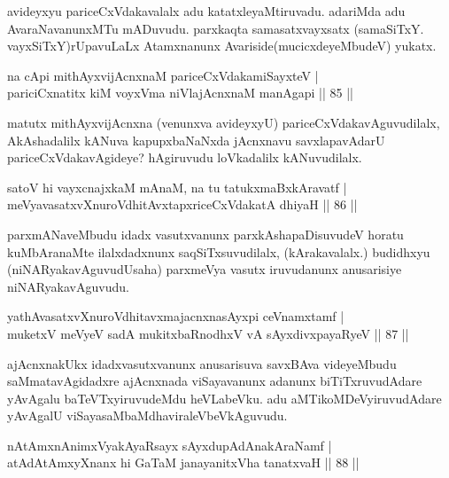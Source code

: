 \begin{artha}
avideyxyu pariceCxVdakavalalx adu katatxleyaMtiruvadu. adariMda adu AvaraNavanunxMTu mADuvudu. parxkaqta samasatxvayxsatx (samaSiTxY. vayxSiTxY)rUpavuLaLx Atamxnanunx Avariside(mucicxdeyeMbudeV) yukatx.
\end{artha}

\begin{shl}
na cApi mithAyxvijAcnxnaM pariceCxVdakamiSayxteV |\\
pariciCxnatitx kiM voyxVma niVlajAcnxnaM manAgapi \hfill || 85 ||
\end{shl}

\begin{artha}
matutx mithAyxvijAcnxna (venunxva avideyxyU) pariceCxVdakavAguvudilalx, AkAshadalilx 
kANuva kapupxbaNaNxda jAcnxnavu savxlapavAdarU pariceCxVdakavAgideye? hAgiruvudu loVkadalilx 
kANuvudilalx.
\end{artha}

\begin{shl}
satoV hi vayxcnajxkaM mAnaM, na tu tatukxmaBxkAravatf |\\
meVyavasatxvXnuroVdhitAvxtapxriceCxVdakatA dhiyaH \hfill || 86 ||
\end{shl}

\begin{artha}
parxmANaveMbudu idadx vasutxvanunx parxkAshapaDisuvudeV horatu kuMbAranaMte ilalxdadxnunx 
saqSiTxsuvudilalx, (kArakavalalx.) budidhxyu (niNARyakavAguvudUsaha) parxmeVya vasutx 
iruvudanunx anusarisiye niNARyakavAguvudu.
\end{artha}

\begin{shl}
yathAvasatxvXnuroVdhitavxmajacnxnasAyxpi ceVnamxtamf |\\
muketxV meVyeV sadA mukitxbaRnodhxV vA sAyxdivxpayaRyeV \hfill || 87 ||
\end{shl}

\begin{artha}
ajAcnxnakUkx idadxvasutxvanunx anusarisuva savxBAva videyeMbudu saMmatavAgidadxre ajAcnxnada viSayavanunx adanunx biTiTxruvudAdare yAvAgalu baTeVTxyiruvudeMdu heVLabeVku. adu aMTikoMDeVyiruvudAdare yAvAgalU viSayasaMbaMdhaviraleVbeVkAguvudu.
\end{artha}


\begin{shl}
nA\s \s tAmx\s nAnimxVyakAyaRsayx sAyxdupAdAnakAraNamf |\\
atAdAtAmxyXnanx hi GaTaM janayanitxVha tanatxvaH \hfill || 88 ||
\end{shl}

